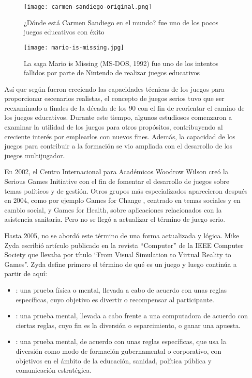 \begin{figure}[H] 
	\begin{center}
		\texttt{[image: carmen-sandiego-original.png]}
	\end{center}
	\caption{¿Dónde está Carmen Sandiego en el mundo? fue uno de los pocos juegos educativos con éxito}
	\label{fig:carmen-sandiego}
\end{figure}

\begin{figure}[H] 
	\begin{center}
		\texttt{[image: mario-is-missing.jpg]}
	\end{center}
	\caption{La saga Mario is Missing (MS-DOS, 1992) fue uno de los intentos fallidos por parte de Nintendo de realizar juegos educativos}
	\label{fig:mario-is-missing}
\end{figure}

Así que según fueron creciendo las capacidades técnicas de los juegos para proporcionar escenarios realistas, el concepto de juegos serios tuvo que ser reexaminado a finales de la década de los 90 con el fin de reorientar el camino de los juegos educativos. Durante este tiempo, algunos estudiosos comenzaron a examinar la utilidad de los juegos para otros propósitos, contribuyendo al creciente interés por emplearlos con nuevos fines. Además, la capacidad de los juegos para contribuir a la formación se vio ampliada con el desarrollo de los juegos multijugador. 

En 2002, el Centro Internacional para Académicos Woodrow Wilson creó la Serious Games Initiative  con el fin de fomentar el desarrollo de juegos sobre temas políticos y de gestión. Otros grupos más especializados aparecieron después en 2004, como por ejemplo Games for Change , centrado en temas sociales y en cambio social, y Games for Health, sobre aplicaciones relacionados con la asistencia sanitaria. Pero no se llegó a actualizar el término de juego serio.

Hasta 2005, no se abordó este término de una forma actualizada y lógica. Mike Zyda escribió artículo publicado en la revista ``Computer'' de la IEEE Computer Society que llevaba por título ``From Visual Simulation to Virtual Reality to Games''\cite{mzynda}. Zyda define primero el término de qué es un juego y luego continúa a partir de aquí:

\begin{itemize}
	\item {}: una prueba física o mental, llevada a cabo de acuerdo con unas reglas específicas, cuyo objetivo es divertir o recompensar al participante.
	\item {}: una prueba mental, llevada a cabo frente a una computadora de acuerdo con ciertas reglas, cuyo fin es la diversión o esparcimiento, o ganar una apuesta.
	\item {}: una prueba mental, de acuerdo con unas reglas específicas, que usa la diversión como modo de formación gubernamental o corporativo, con objetivos en el ámbito de la educación, sanidad, política pública y comunicación estratégica.
\end{itemize}

